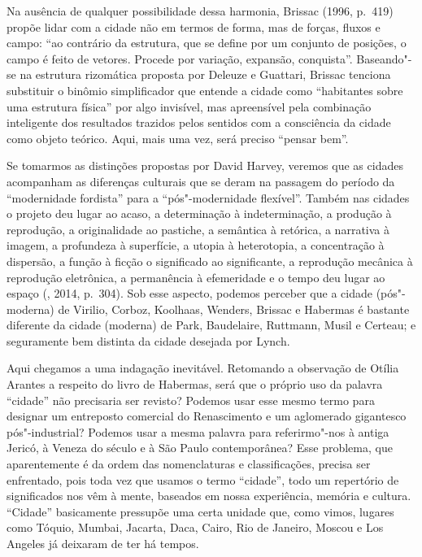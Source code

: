 Na ausência de qualquer possibilidade dessa harmonia, Brissac (1996,
p.~419) propõe lidar com a cidade não em termos de forma, mas de forças,
fluxos e campo: ``ao contrário da estrutura, que se define por um
conjunto de posições, o campo é feito de vetores. Procede por variação,
expansão, conquista''. Baseando"-se na estrutura rizomática proposta por
Deleuze e Guattari, Brissac tenciona substituir o binômio
simplificador que entende a cidade como ``habitantes sobre uma estrutura
física'' por algo invisível, mas apreensível pela combinação inteligente
dos resultados trazidos pelos sentidos com a consciência da cidade como
objeto teórico. Aqui, mais uma vez, será preciso ``pensar bem''.

Se tomarmos as distinções propostas por David Harvey, veremos que as
cidades acompanham as diferenças culturais que se deram na passagem do
período da ``modernidade fordista'' para a ``pós"-modernidade flexível''.
Também nas cidades o projeto deu lugar ao acaso, a determinação à
indeterminação, a produção à reprodução, a originalidade ao pastiche, a
semântica à retórica, a narrativa à imagem, a profundeza à superfície, a
utopia à heterotopia, a concentração à dispersão, a função à ficção o
significado ao significante, a reprodução mecânica à reprodução
eletrônica, a permanência à efemeridade e o tempo deu lugar ao espaço
(, 2014, p.~304). Sob esse aspecto, podemos perceber que a cidade
(pós"-moderna) de Virilio, Corboz, Koolhaas, Wenders, Brissac e Habermas
é bastante diferente da cidade (moderna) de Park, Baudelaire, Ruttmann,
Musil e Certeau; e seguramente bem distinta da cidade desejada por
Lynch.

Aqui chegamos a uma indagação inevitável. Retomando a observação de
Otília Arantes a respeito do livro de Habermas, será que o próprio uso
da palavra ``cidade'' não precisaria ser revisto? Podemos usar esse
mesmo termo para designar um entreposto comercial do Renascimento e um
aglomerado gigantesco pós"-industrial? Podemos usar a mesma palavra para
referirmo"-nos à antiga Jericó, à Veneza do século  e à São Paulo
contemporânea? Esse problema, que aparentemente é da ordem das
nomenclaturas e classificações, precisa ser enfrentado, pois toda vez
que usamos o termo ``cidade'', todo um repertório de significados nos
vêm à mente, baseados em nossa experiência, memória e cultura.
``Cidade'' basicamente pressupõe uma certa unidade que, como vimos,
lugares como Tóquio, Mumbai, Jacarta, Daca, Cairo, Rio de Janeiro,
Moscou e Los Angeles já deixaram de ter há tempos.

